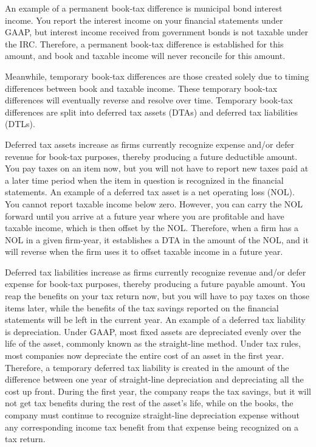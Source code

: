 \documentclass{article}
\begin{document}
An example of a permanent book-tax difference is municipal bond interest income. You report the interest income on your financial statements under GAAP, but interest income received from government bonds is not taxable under the IRC. Therefore, a permanent book-tax difference is established for this amount, and book and taxable income will never reconcile for this amount.

Meanwhile, temporary book-tax differences are those created solely due to timing differences between book and taxable income. These temporary book-tax differences will eventually reverse and resolve over time. Temporary book-tax differences are split into deferred tax assets (DTAs) and deferred tax liabilities (DTLs).

Deferred tax assets increase as firms currently recognize expense and/or defer revenue for book-tax purposes, thereby producing a future deductible amount. You pay taxes on an item now, but you will not have to report new taxes paid at a later time period when the item in question is recognized in the financial statements. An example of a deferred tax asset is a net operating loss (NOL). You cannot report taxable income below zero. However, you can carry the NOL forward until you arrive at a future year where you are profitable and have taxable income, which is then offset by the NOL. Therefore, when a firm has a NOL in a given firm-year, it establishes a DTA in the amount of the NOL, and it will reverse when the firm uses it to offset taxable income in a future year.

Deferred tax liabilities increase as firms currently recognize revenue and/or defer expense for book-tax purposes, thereby producing a future payable amount. You reap the benefits on your tax return now, but you will have to pay taxes on those items later, while the benefits of the tax savings reported on the financial statements will be left in the current year. An example of a deferred tax liability is depreciation. Under GAAP, most fixed assets are depreciated evenly over the life of the asset, commonly known as the straight-line method. Under tax rules, most companies now depreciate the entire cost of an asset in the first year. Therefore, a temporary deferred tax liability is created in the amount of the difference between one year of straight-line depreciation and depreciating all the cost up front. During the first year, the company reaps the tax savings, but it will not get tax benefits during the rest of the asset’s life, while on the books, the company must continue to recognize straight-line depreciation expense without any corresponding income tax benefit from that expense being recognized on a tax return.
\end{document}

